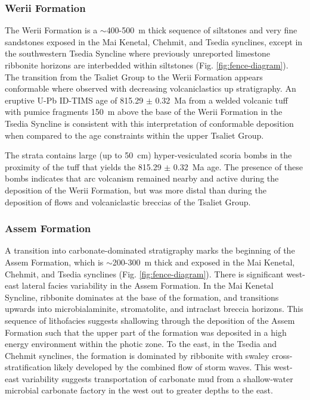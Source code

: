 \subsubsection{Werii Formation}

The Werii Formation is a $\sim$400-500~m thick sequence of siltstones and very fine sandstones exposed in the Mai Kenetal, Chehmit, and Tsedia synclines, except in the southwestern Tsedia Syncline where previously unreported limestone ribbonite horizons are interbedded within siltstones (Fig. \ref{fig:fence-diagram}). The transition from the Tsaliet Group to the Werii Formation appears conformable where observed with decreasing volcaniclastics up stratigraphy. An eruptive U-Pb ID-TIMS age of 815.29 $\pm$ 0.32~Ma from a welded volcanic tuff with pumice fragments 150~m above the base of the Werii Formation in the Tsedia Syncline \citep{Swanson-Hysell2015a} is consistent with this interpretation of conformable deposition when compared to the age constraints within the upper Tsaliet Group.

The strata contains large (up to 50~cm) hyper-vesiculated scoria bombs in the proximity of the tuff that yields the 815.29 $\pm$ 0.32~Ma age. The presence of these bombs indicates that arc volcanism remained nearby and active during the deposition of the Werii Formation, but was more distal than during the deposition of flows and volcaniclastic breccias of the Tsaliet Group.

\subsubsection{Assem Formation}

A transition into carbonate-dominated stratigraphy marks the beginning of the Assem Formation, which is $\sim$200-300~m thick and exposed in the Mai Kenetal, Chehmit, and Tsedia synclines (Fig. \ref{fig:fence-diagram}). There is significant west-east lateral facies variability in the Assem Formation. In the Mai Kenetal Syncline, ribbonite dominates at the base of the formation, and transitions upwards into microbialaminite, stromatolite, and intraclast breccia horizons. This sequence of lithofacies suggests shallowing through the deposition of the Assem Formation such that the upper part of the formation was deposited in a high energy environment within the photic zone. To the east, in the Tsedia and Chehmit synclines, the formation is dominated by ribbonite with swaley cross-stratification likely developed by the combined flow of storm waves. This west-east variability suggests transportation of carbonate mud from a shallow-water microbial carbonate factory in the west out to greater depths to the east.

